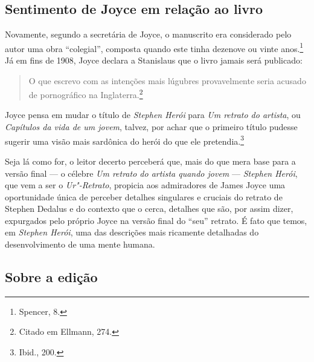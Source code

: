\subsection*{Sentimento de Joyce em relação ao livro}

Novamente, segundo a secretária de Joyce, o manuscrito era considerado
pelo autor uma obra “colegial”, composta quando este tinha dezenove ou
vinte anos.\footnote{ Spencer, 8.}  Já em fins de 1908, Joyce declara a Stanislaus		
que o livro jamais será publicado: 

\begin{quote}
O que escrevo com as intenções mais
lúgubres provavelmente seria acusado de pornográfico na Inglaterra.\footnote{			
Citado em Ellmann, 274.} 
\end{quote}

Joyce pensa em mudar o título de
\textit{Stephen Herói} para \textit{Um retrato do artista}, ou
\textit{Capítulos da vida de um jovem}, talvez, por achar que o
primeiro título pudesse sugerir uma visão mais sardônica do herói do
que ele pretendia.\footnote{ Ibid., 200.}					

Seja lá como for, o leitor decerto perceberá que, mais do que mera base
para a versão final --- o célebre \textit{Um retrato do artista quando
jovem} --- \textit{Stephen Herói}, que vem a ser o \textit{Ur"-Retrato},
propicia aos admiradores de James Joyce uma oportunidade única de
perceber detalhes singulares e cruciais do retrato de Stephen Dedalus		
e do contexto que o cerca, detalhes que são, por assim dizer,
expurgados pelo próprio Joyce na versão final do “seu” retrato.  É fato
que temos, em \textit{Stephen Herói}, uma das descrições mais ricamente
detalhadas do desenvolvimento de uma mente humana.


\subsection*{Sobre a edição}

